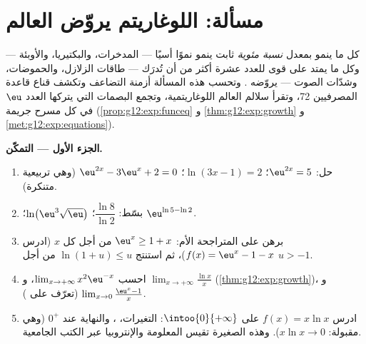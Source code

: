 \section{مسألة: اللوغاريتم يروّض العالم}

\begin{problem}
\label{pb:g12:exp:1}
كل ما ينمو بمعدل \emph{نسبة مئوية} ثابت ينمو
نموًا أسيًا --- المدخرات، والبكتيريا، والأوبئة --- وكل ما
يمتد على قوى للعدد عشرة أكثر من أن تُدرَك --- طاقات الزلازل،
والحموضات، وشدّات الصوت --- يروّضه . وتحسب هذه
المسألة أزمنة التضاعف وتكشف قناع قاعدة المصرفيين
72، وتقرأ سلالم العالم اللوغاريتمية، وتجمع
البصمات التي يتركها العدد $\eu$ في كل مسرح جريمة
(\cref{prop:g12:exp:funceq} و \cref{thm:g12:exp:growth} و
\cref{met:g12:exp:equations}).

\medskip
\noindent\textbf{الجزء الأول --- التمكّن.}
\begin{enumerate}
  \item حل: $\eu^{2x} = 5$؛ \quad $\ln(3x - 1) = 2$؛ \quad
        $\eu^{2x} - 3\eu^x + 2 = 0$ (وهي تربيعية متنكرة).
  \item بسّط: $\dfrac{\ln 8}{\ln 2}$؛ \quad
        $\ln\!\left(\eu^3 \sqrt{\eu}\right)$؛ \quad
        $\eu^{\ln 5 - \ln 2}$.
  \item برهن على المتراجحة الأم: $\eu^x \geq 1 + x$ من أجل كل
         $x$ (ادرس $f(x) = \eu^x - 1 - x$)، ثم استنتج
        $\ln(1 + u) \leq u$ من أجل $u > -1$.
  \item احسب
        $\lim_{x \to +\infty} x^2 \eu^{-x}$،
        و $\lim_{x \to +\infty} \frac{\ln x}{x}$
        (\cref{thm:g12:exp:growth})، و
        $\lim_{x \to 0} \frac{\eu^x - 1}{x}$ (تعرّف على
        ).
  \item ادرس $f(x) = x \ln x$ على $\intoo{0}{+\infty}$:
        التغيرات، ، والنهاية عند $0^+$ (وهي مقبولة:
        $x \ln x \to 0$). وهذه  الصغيرة تقيس
        المعلومة والإنتروبيا عبر الكتب الجامعية.
\end{enumerate}


\end{problem}
